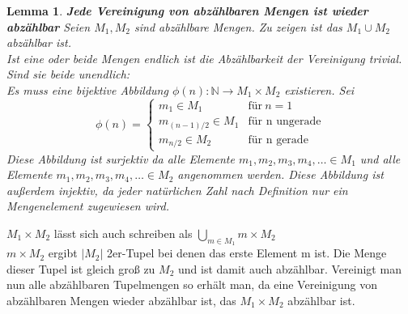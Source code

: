 \documentclass{article}
\begin{document}
        \newtheorem{lemma}{Lemma}
        \begin{lemma}
            \textbf{Jede Vereinigung von abzählbaren Mengen ist wieder abzählbar}
            Seien \(M_1, M_2\) sind abzählbare Mengen. Zu zeigen ist das \(M_1 \cup M_2\) abzählbar ist. \\
            Ist eine oder beide Mengen endlich ist die Abzählbarkeit der Vereinigung trivial.
            Sind sie beide unendlich: \\
            Es muss eine bijektive Abbildung \(\phi(n): \mathbb{N} \to M_1 \times M_2 \) existieren.
            Sei 
            \begin{equation*}
                \phi(n) =
                \begin{cases}
                    m_1 \in M_1 & \text{für} \: n = 1 \\
                    m_{(n-1)/2} \in M_1 & \text{für n ungerade} \\
                    m_{n/2} \in M_2 & \text{für n gerade}
                \end{cases}
            \end{equation*}
            Diese Abbildung ist surjektiv da alle Elemente \(m_1, m_2, m_3, m_4, \ldots \in M_1\) und alle Elemente \(m_1, m_2, m_3, m_4, \ldots \in M_2\) angenommen werden.
            Diese Abbildung ist außerdem injektiv, da jeder natürlichen Zahl nach Definition nur ein Mengenelement zugewiesen wird.

        \end{lemma}
        \(M_1 \times M_2\) lässt sich auch schreiben als \(\bigcup_{m \in M_1} m \times M_2 \) \\
        \(m \times M_2\) ergibt \(|M_2|\) 2er-Tupel bei denen das erste Element m ist. Die Menge dieser Tupel ist gleich groß
        zu \(M_2\) und ist damit auch abzählbar.
        Vereinigt man nun alle abzählbaren Tupelmengen so erhält man, da eine Vereinigung von abzählbaren Mengen wieder abzählbar ist,
        das \(M_1 \times M_2 \) abzählbar ist. 
\end{document}
